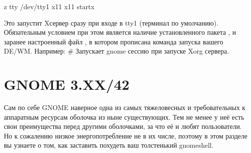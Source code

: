 \documentclass[letterpaper,10pt,russian,openany]{sphinxmanual}
\begin{document}
\begin{sphinxVerbatim}[commandchars=\\\{\}]
 \PYG{o}{[}\PYG{o}{[} \PYGZhy{}z   tty  /dev/tty1 \PYG{o}{]}\PYG{o}{]} 
  x11 x11  startx
\end{sphinxVerbatim}

\sphinxAtStartPar
Это запустит X\sphinxhyphen{}сервер сразу при входе в tty1 (терминал по умолчанию).
Обязательным условием при этом является наличие установленного пакета ,
и заранее настроенный файл , в котором прописана команда запуска вашего DE/WM.
Например:  \# Запускает gnome сессию при запуске Xorg сервера.

\ignorespaces 

\section{GNOME 3.XX/42}
\label{\detokenize{source/de-optimizations:gnome-3-xx-42}}\label{\detokenize{source/de-optimizations:gnome-optimization}}\label{\detokenize{source/de-optimizations:index-1}}
\sphinxAtStartPar
Сам по себе GNOME \sphinxhyphen{} наверное одна из самых тяжеловесных и требовательных к аппаратным ресурсам оболочка из ныне существующих.
Тем не менее у неё есть свои преимущества перед другими оболочками, за что её и любят пользователи.
Но к сожалению низкое энергопотребление не в их числе, поэтому в этом разделе вы узнаете о том,
как заставить похудеть ваш толстенький gnome\sphinxhyphen{}shell.

\ignorespaces 
\end{document}
